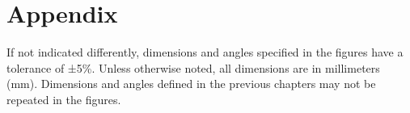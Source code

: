 \documentclass[a4paper]{report}
\begin{document}
{{{%
%
%

 
\appendix
\chapter{Appendix}
If not indicated differently, dimensions and angles specified in the figures have a tolerance of
±5\%. Unless otherwise noted, all dimensions are in millimeters (mm).
Dimensions and angles defined in the previous chapters may not be repeated in the figures.

}}}
\end{document}
